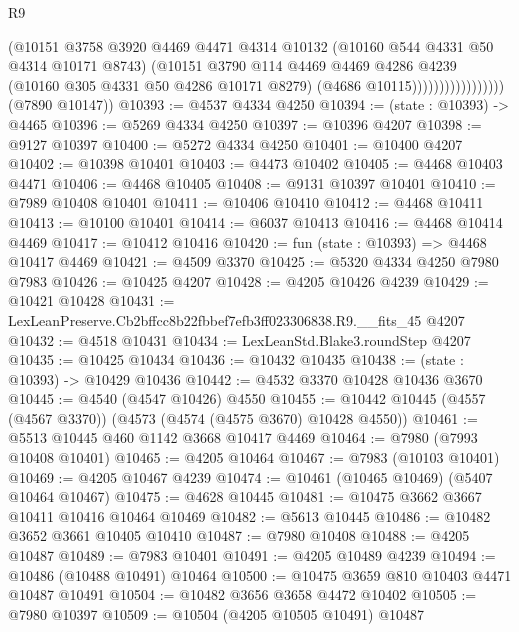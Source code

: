 \begin{lexlean}{R9}
\begin{coremodule}
                                  (@10151
                                    @3758
                                    @3920
                                    @4469
                                    @4471
                                    @4314
                                    @10132
                                    (@10160 @544 @4331 @50 @4314 @10171 @8743)
                                    (@10151
                                      @3790
                                      @114
                                      @4469
                                      @4469
                                      @4286
                                      @4239
                                      (@10160 @305 @4331 @50 @4286 @10171 @8279)
                                      (@4686 @10115)))))))))))))))))
      (@7890 @10147))
@10393 := @4537 @4334 @4250
@10394 := (state : @10393) -> @4465
@10396 := @5269 @4334 @4250
@10397 := @10396 @4207
@10398 := @9127 @10397
@10400 := @5272 @4334 @4250
@10401 := @10400 @4207
@10402 := @10398 @10401
@10403 := @4473 @10402
@10405 := @4468 @10403 @4471
@10406 := @4468 @10405
@10408 := @9131 @10397 @10401
@10410 := @7989 @10408 @10401
@10411 := @10406 @10410
@10412 := @4468 @10411
@10413 := @10100 @10401
@10414 := @6037 @10413
@10416 := @4468 @10414 @4469
@10417 := @10412 @10416
@10420 := fun (state : @10393) => @4468 @10417 @4469
@10421 := @4509 @3370
@10425 := @5320 @4334 @4250 @7980 @7983
@10426 := @10425 @4207
@10428 := @4205 @10426 @4239
@10429 := @10421 @10428
@10431 := LexLeanPreserve.Cb2bffcc8b22fbbef7efb3ff023306838.R9.__fits_45 @4207
@10432 := @4518 @10431
@10434 := LexLeanStd.Blake3.roundStep @4207
@10435 := @10425 @10434
@10436 := @10432 @10435
@10438 := (state : @10393) -> @10429 @10436
@10442 := @4532 @3370 @10428 @10436 @3670
@10445 := @4540 (@4547 @10426) @4550
@10455 := @10442 @10445 (@4557 (@4567 @3370)) (@4573 (@4574 (@4575 @3670) @10428 @4550))
@10461 := @5513 @10445 @460 @1142 @3668 @10417 @4469
@10464 := @7980 (@7993 @10408 @10401)
@10465 := @4205 @10464
@10467 := @7983 (@10103 @10401)
@10469 := @4205 @10467 @4239
@10474 := @10461 (@10465 @10469) (@5407 @10464 @10467)
@10475 := @4628 @10445
@10481 := @10475 @3662 @3667 @10411 @10416 @10464 @10469
@10482 := @5613 @10445
@10486 := @10482 @3652 @3661 @10405 @10410
@10487 := @7980 @10408
@10488 := @4205 @10487
@10489 := @7983 @10401
@10491 := @4205 @10489 @4239
@10494 := @10486 (@10488 @10491) @10464
@10500 := @10475 @3659 @810 @10403 @4471 @10487 @10491
@10504 := @10482 @3656 @3658 @4472 @10402
@10505 := @7980 @10397
@10509 := @10504 (@4205 @10505 @10491) @10487

\end{coremodule}
\end{lexlean}
